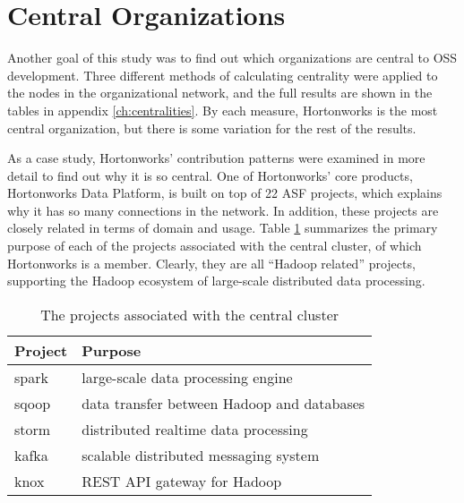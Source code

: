 \section{Central Organizations}
Another goal of this study was to find out which organizations are central to OSS development. Three different methods of calculating centrality were applied to the nodes in the organizational network, and the full results are shown in the tables in appendix \ref{ch:centralities}. By each measure, Hortonworks is the most central organization, but there is some variation for the rest of the results.

As a case study, Hortonworks' contribution patterns were examined in more detail to find out why it is so central. One of Hortonworks' core products, Hortonworks Data Platform, is built on top of 22 ASF projects\cite{hdp}, which explains why it has so many connections in the network. In addition, these projects are closely related in terms of domain and usage. Table \ref{tab:centralclusterprojects} summarizes the primary purpose of each of the projects associated with the central cluster, of which Hortonworks is a member. Clearly, they are all ``Hadoop related'' projects\cite{hadoopecosystem}, supporting the Hadoop ecosystem of large-scale distributed data processing.

\begin{table}
	\begin{tabular}{l|l}
		\bfseries Project & \bfseries Purpose \\
		\hline
		spark & large-scale data processing engine\cite{spark} \\
		sqoop & data transfer between Hadoop and databases\cite{sqoop} \\
		storm & distributed realtime data processing\cite{storm} \\
		kafka & scalable distributed messaging system\cite{kafka} \\
		knox & REST API gateway for Hadoop\cite{knox}
	\end{tabular}
	\centering
	\caption{The projects associated with the central cluster}\label{tab:centralclusterprojects}
\end{table}

